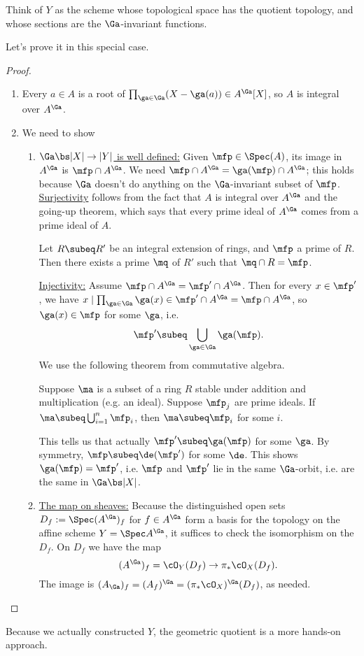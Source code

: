 Think of $Y$ as the scheme whose topological space has the quotient topology, and whose sections are the $\Ga$-invariant functions.

Let's prove it in this special case.

\begin{proof}
\begin{enumerate}
\item
Every $a\in A$ is a root of $\prod_{\ga\in \Ga} (X-\ga(a))\in A^{\Ga}[X]$, so $A$ is integral over $A^{\Ga}$.
\item We need to show
\begin{enumerate}
\item
\ul{$\Ga\bs |X|\to |Y|$ is well defined:} Given $\mfp \in \Spec(A)$, its image in $A^{\Ga}$ is $\mfp\cap A^{\Ga}$. We need $\mfp \cap A^{\Ga}=\ga(\mfp)\cap A^{\Ga}$; this holds because $\Ga$ doesn't do anything on the $\Ga$-invariant subset of $\mfp$. \\

\ul{Surjectivity} follows from the fact that $A$ is integral over $A^{\Ga}$ and the going-up theorem, which says that every prime ideal of $A^{\Ga}$ comes from a prime ideal of $A$.

\begin{thm}[Going up]
Let $R\subeq R'$ be an integral extension of rings, and $\mfp$ a prime of $R$. Then there exists a prime $\mq$ of $R'$ such that $\mq\cap R=\mfp$.
\end{thm}


\ul{Injectivity:} Assume $\mfp\cap A^{\Ga}=\mfp'\cap A^{\Ga}$. Then for every $x\in \mfp'$, we have $x\mid \prod_{\ga\in \Ga}\ga(x)\in \mfp'\cap A^{\Ga}=\mfp \cap A^{\Ga}$, so $\ga(x)\in \mfp$ for some $\ga$, i.e. 
\[
\mfp'\subeq \bigcup_{\ga\in \Ga}\ga(\mfp).
\]
We use the following theorem from commutative algebra.
\begin{thm}
Suppose $\ma$ is a subset of a ring $R$ stable under addition and multiplication (e.g. an ideal). Suppose $\mfp_j$ are prime ideals.  %
If $\ma\subeq \bigcup_{i=1}^n \mfp_i$, then $\ma\subeq \mfp_i$ for some $i$.
\end{thm}
This tells us that actually $\mfp'\subeq \ga(\mfp)$ for some $\ga$. By symmetry, $\mfp \subeq \de(\mfp')$ for some $\de$. %
This shows $\ga(\mfp)=\mfp'$, i.e. $\mfp$ and $\mfp'$ lie in the same $\Ga$-orbit, i.e. are the same in $\Ga\bs |X|$.
\item \ul{The map on sheaves:} Because the distinguished open sets $D_f:=\Spec(A^{\Ga})_f$ for $f\in A^{\Ga}$ form a basis for the topology on the affine scheme $Y=\Spec A^{\Ga}$, it suffices to check the isomorphism on the $D_f$. On $D_f$ we have the map 
\[
(A^{\Ga})_f=\cO_Y(D_f)\to \pi_*\cO_X(D_f).
\]
The image is $(A_{\Ga})_f=(A_f)^{\Ga}=(\pi_*\cO_X)^{\Ga}(D_f)$, as needed.
\end{enumerate}
\end{enumerate}
\end{proof}
Because we actually constructed $Y$, the geometric quotient is a more hands-on approach.

